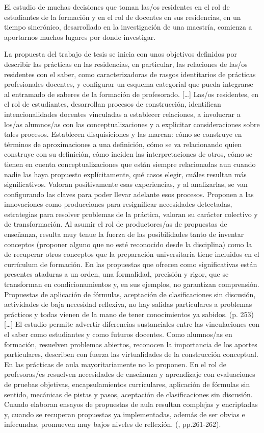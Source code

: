 \documentclass[oneside,spanish]{amsart}
\numberwithin{equation}{section}
\numberwithin{figure}{section}
\theoremstyle{definition}
\begin{document}
El estudio de muchas decisiones que toman las/os residentes en el rol de estudiantes de la formación y en el rol de docentes en sus residencias, en un tiempo sincrónico, desarrollado en la investigación de una maestría, comienza a aportarnos muchos lugares por donde investigar. 

La propuesta del trabajo de tesis se inicia con unos objetivos definidos por describir las prácticas en las residencias, en particular, las relaciones de las/os residentes con el saber, como caracterizadoras de rasgos identitarios de prácticas profesionales docentes, y configurar un esquema categorial que pueda integrarse al entramado de saberes de la formación de profesorado. […] Las/os residentes, en el rol de estudiantes, desarrollan procesos de construcción, identifican intencionalidades docentes vinculadas a establecer relaciones, a involucrar a los/as alumnos/as con las conceptualizaciones y a explicitar consideraciones sobre tales procesos. Establecen disquisiciones y las marcan: cómo se construye en términos de aproximaciones a una definición, cómo se va relacionando quien construye con su definición, cómo inciden las interpretaciones de otros, cómo se tienen en cuenta conceptualizaciones que están siempre relacionadas aun cuando nadie las haya propuesto explícitamente, qué casos elegir, cuáles resultan más significativos. Valoran positivamente esas experiencias, y al analizarlas, se van configurando las claves para poder llevar adelante esos procesos. Proponen a las innovaciones como producciones para resignificar necesidades detectadas, estrategias para resolver problemas de la práctica, valoran su carácter colectivo y de transformación. Al asumir el rol de productores/as de propuestas de enseñanza, resulta muy tenue la fuerza de las posibilidades tanto de inventar conceptos (proponer alguno que no esté reconocido desde la disciplina) como la de recuperar otros conceptos que la preparación universitaria tiene incluidos en el currículum de formación. En las propuestas que ofrecen como significativas están presentes ataduras a un orden, una formalidad, precisión y rigor, que se transforman en condicionamientos y, en sus ejemplos, no garantizan comprensión. Propuestas de aplicación de fórmulas, aceptación de clasificaciones sin discusión, actividades de baja necesidad reflexiva, no hay salidas particulares a problemas prácticos y todas vienen de la mano de tener conocimientos ya sabidos. (p. 253) […] El estudio permite advertir diferencias sustanciales entre las vinculaciones con el saber como estudiantes y como futuros docentes. Como alumnos/as en formación, resuelven problemas abiertos, reconocen la importancia de los aportes particulares, describen con fuerza las virtualidades de la construcción conceptual. En las prácticas de aula mayoritariamente no lo proponen. En el rol de profesoras/es resuelven necesidades de enseñanza y aprendizaje con evaluaciones de pruebas objetivas, encapsulamientos curriculares, aplicación de fórmulas sin sentido, mecánicas de pistas y pasos, aceptación de clasificaciones sin discusión. Cuando elaboran ensayos de propuestas de aula resultan complejas y encriptadas y, cuando se recuperan propuestas ya implementadas, además de ser obvias e infecundas, promueven muy bajos niveles de reflexión. (\cite{difranco18}, pp.261-262).
\end{document}
